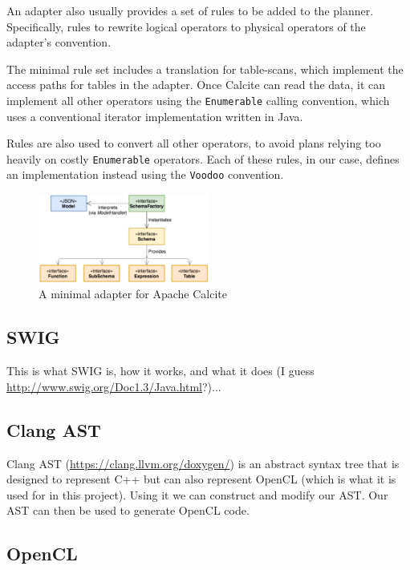 An adapter also usually provides a set of rules to be added to the planner. Specifically, rules to rewrite logical operators to physical operators of the adapter's convention.

The minimal rule set includes a translation for table-scans, which implement the access paths for tables in the adapter. Once Calcite can read the data, it can implement all other operators using the \texttt{Enumerable} calling convention, which uses a conventional iterator implementation written in Java.

Rules are also used to convert all other operators, to avoid plans relying too heavily on costly \texttt{Enumerable} operators. Each of these rules, in our case, defines an implementation instead using the \texttt{Voodoo} convention.

\begin{figure}
\includegraphics[width=0.5\textwidth]{design-and-implementation/calcite-adapter.png}
\centering
\caption{A minimal adapter for Apache Calcite \cite{Begoli:2018:ACF:3183713.3190662}}
\label{fig:calcite-adapter}
\end{figure}

\subsection{SWIG}

This is what SWIG is, how it works, and what it does (I guess \url{http://www.swig.org/Doc1.3/Java.html}?)...

\subsection{Clang AST}

Clang AST (\url{https://clang.llvm.org/doxygen/}) is an abstract syntax tree that is designed to represent C++ but can also represent OpenCL (which is what it is used for in this project). Using it we can construct and modify our AST. Our AST can then be used to generate OpenCL code.

\subsection{OpenCL}


